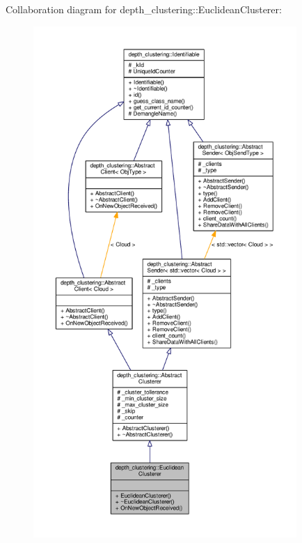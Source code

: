 Collaboration diagram for depth\-\_\-clustering\-:\-:Euclidean\-Clusterer\-:
\nopagebreak
\begin{figure}[H]
\begin{center}
\leavevmode
\includegraphics[height=550pt]{classdepth__clustering_1_1EuclideanClusterer__coll__graph}
\end{center}
\end{figure}


